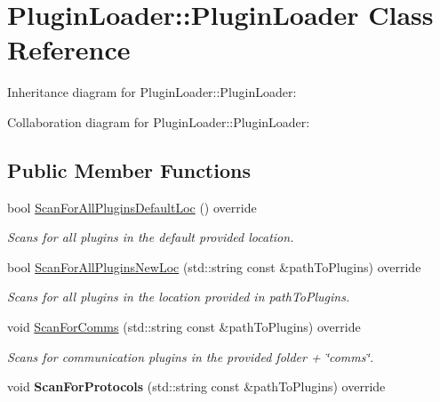 \hypertarget{classPluginLoader_1_1PluginLoader}{}\section{Plugin\+Loader\+::Plugin\+Loader Class Reference}
\label{classPluginLoader_1_1PluginLoader}


Inheritance diagram for Plugin\+Loader\+::Plugin\+Loader\+:


Collaboration diagram for Plugin\+Loader\+::Plugin\+Loader\+:
\subsection*{Public Member Functions}
\begin{DoxyCompactItemize}
\item 
bool \mbox{\hyperlink{classPluginLoader_1_1PluginLoader_ad8d58265abe6e32b168651f47e3022ba}{Scan\+For\+All\+Plugins\+Default\+Loc}} () override
\begin{DoxyCompactList}\small\item\em Scans for all plugins in the default provided location. \end{DoxyCompactList}\item 
bool \mbox{\hyperlink{classPluginLoader_1_1PluginLoader_a4dcb91357b495a63a5a9366057e8ec2c}{Scan\+For\+All\+Plugins\+New\+Loc}} (std\+::string const \&path\+To\+Plugins) override
\begin{DoxyCompactList}\small\item\em Scans for all plugins in the location provided in path\+To\+Plugins. \end{DoxyCompactList}\item 
void \mbox{\hyperlink{classPluginLoader_1_1PluginLoader_a38094a2d63eee060875475b04061e538}{Scan\+For\+Comms}} (std\+::string const \&path\+To\+Plugins) override
\begin{DoxyCompactList}\small\item\em Scans for communication plugins in the provided folder + \char`\"{}comms\char`\"{}. \end{DoxyCompactList}\item 
\mbox{\label{classPluginLoader_1_1PluginLoader_a709640b868ed08aab7b144aafe136cd7}} 
void {\bfseries Scan\+For\+Protocols} (std\+::string const \&path\+To\+Plugins) override
\item 
\mbox{\label{classPluginLoader_1_1PluginLoader_a433417944f8ba039b6adbc2271701f0b}} 

\end{DoxyCompactItemize}
